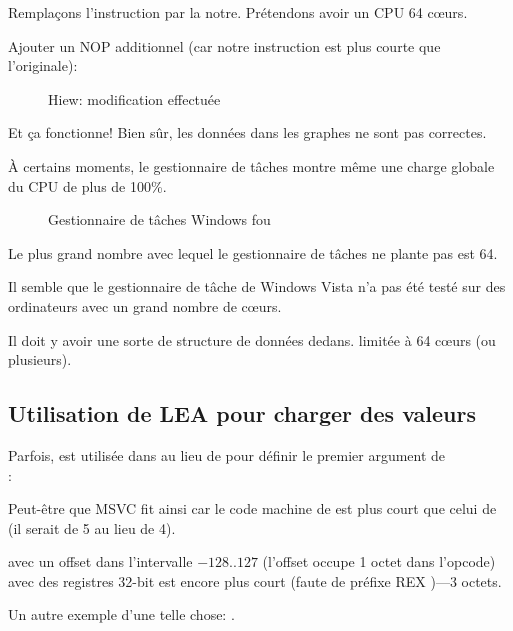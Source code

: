 Remplaçons l'instruction   par la notre.
Prétendons avoir un CPU 64 c\oe{}urs.

Ajouter un \ac{NOP} additionnel (car notre instruction est plus courte que l'originale):

\begin{figure}[H]
\centering
{}
\caption{Hiew: modification effectuée}
\end{figure}

Et ça fonctionne!
Bien sûr, les données dans les graphes ne sont pas correctes.

À certains moments, le gestionnaire de tâches montre même une charge globale du CPU
de plus de 100\%.

\begin{figure}[H]
\centering
{}
\caption{Gestionnaire de tâches Windows fou}
\end{figure}

Le plus grand nombre avec lequel le gestionnaire de tâches ne plante pas est 64.

Il semble que le gestionnaire de tâche de Windows Vista n'a pas été testé sur des
ordinateurs avec un grand nombre de c\oe{}urs.

Il doit y avoir une sorte de structure de données dedans. limitée à 64 c\oe{}urs
(ou plusieurs).

\subsection{Utilisation de LEA pour charger des valeurs}
\label{TaskMgr_LEA}

Parfois,  est utilisée dans  au lieu de  pour définir
le premier argument de \\
:




Peut-être que \ac{MSVC} fit ainsi car le code machine de  est plus court
que celui de  (il serait de 5 au lieu de 4).

 avec un offset dans l'intervalle $-128..127$ (l'offset occupe 1 octet dans
l'opcode) avec des registres 32-bit est encore plus court (faute de préfixe REX )---3
octets.

Un autre exemple d'une telle chose: .

